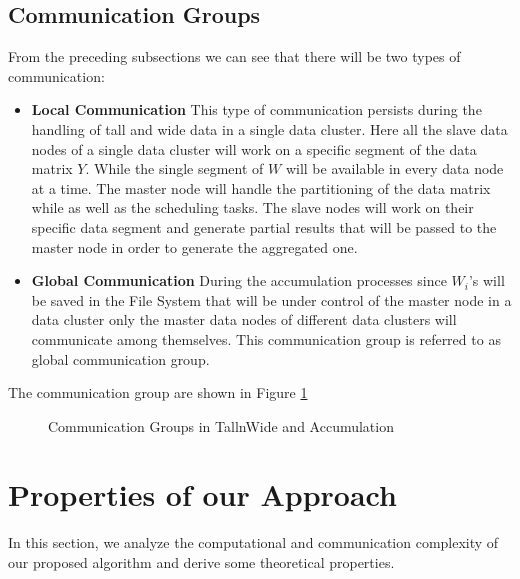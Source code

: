 \documentclass[12pt,notitlepage,oneside]{report}
\begin{document}
\section{Communication Groups}
From the preceding subsections we can see that there will be two types of communication:
\begin{itemize}
\item \textbf{Local Communication}
This type of communication persists during the handling of tall and wide data in a single data cluster. Here all the slave data nodes of a single data cluster will work on a specific segment of the data matrix $Y$. While the single segment of $W$ will be available in every data node at a time. The master node will handle the partitioning of the data matrix while as well as the scheduling tasks. The slave nodes will work on their specific data segment and generate partial results that will be passed to the master node in order to generate the aggregated one. 
\item \textbf{Global Communication}
During the accumulation processes since $W_i$'s will be saved in the File System that will be under control of the master node in a data cluster only the master data nodes of different data clusters will communicate among themselves. This communication group is referred to as global communication group. 
\end{itemize}
The communication group are shown in Figure \ref{communication1}


\begin{figure}[!htbp]
    \centering
    \caption{Communication Groups in TallnWide and Accumulation}
    \label{communication1}
\end{figure}



\chapter{Properties of our Approach}
	\label{c:7}
In this section, we analyze the computational and communication complexity of our proposed algorithm and derive some theoretical properties.
\end{document}
